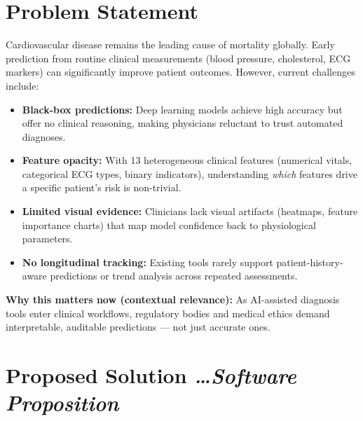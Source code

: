 \documentclass[11pt,a4paper]{article}
\newcommand{\BvrHint}[1]{%
  {\normalfont\normalsize\itshape\hfill #1}}
\begin{document}
\section{Problem Statement}
Cardiovascular disease remains the leading cause of mortality
globally. Early prediction from routine clinical measurements
(blood pressure, cholesterol, ECG markers) can significantly
improve patient outcomes. However, current challenges include:
\begin{itemize}[leftmargin=0.7cm]
    \item \textbf{Black-box predictions:} Deep learning models
      achieve high accuracy but offer no clinical reasoning, making
      physicians reluctant to trust automated diagnoses.
    \item \textbf{Feature opacity:} With 13 heterogeneous clinical
      features (numerical vitals, categorical ECG types, binary
      indicators), understanding \emph{which} features drive a
      specific patient's risk is non-trivial.
    \item \textbf{Limited visual evidence:} Clinicians lack
      visual artifacts (heatmaps, feature importance charts) that
      map model confidence back to physiological parameters.
    \item \textbf{No longitudinal tracking:} Existing tools
      rarely support patient-history-aware predictions or trend
      analysis across repeated assessments.
\end{itemize}

\textbf{Why this matters now (contextual relevance):} As AI-assisted
diagnosis tools enter clinical workflows, regulatory bodies and
medical ethics demand interpretable, auditable predictions ---
not just accurate ones.

\section{Proposed Solution%
  \BvrHint{\ldots Software Proposition}}
\end{document}
